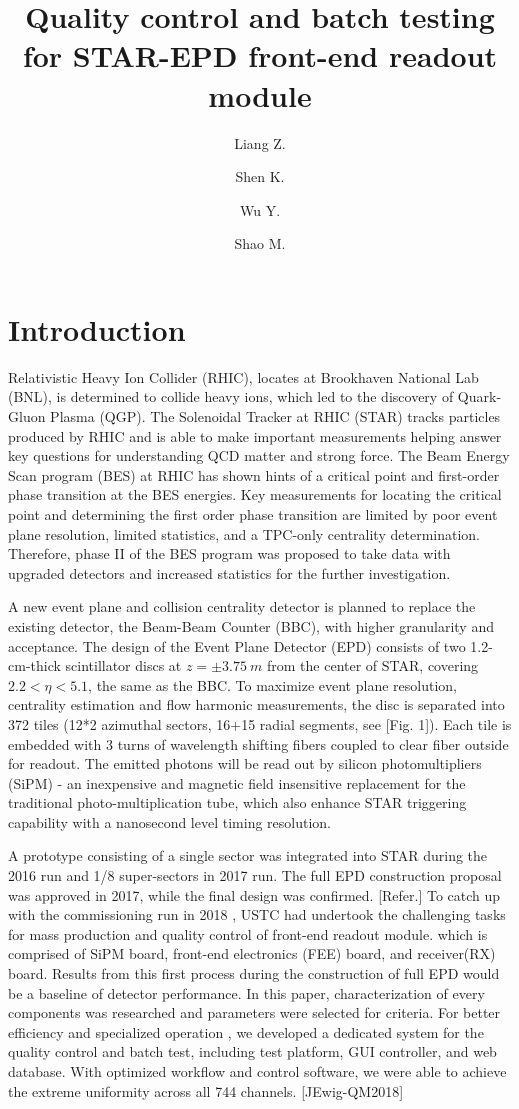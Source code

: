 \documentclass[11pt,a4paper]{article}
\title{Quality control and batch testing for STAR-EPD front-end readout module}
\author[a]{Liang Z.}
\author[a]{Shen K.}
\author[a]{Wu Y.}
\author[a]{Shao M.}
\affiliation[a]{University of Science and Technology of China, JinZhai Road, HEFEI, China}
\begin{document}
\maketitle
\flushbottom

\section{Introduction}
Relativistic Heavy Ion Collider (RHIC), locates at Brookhaven National Lab (BNL), is determined to collide heavy ions, which led to the discovery of Quark-Gluon Plasma (QGP).
The Solenoidal Tracker at RHIC (STAR) tracks particles produced by RHIC and is able to make important measurements helping answer key questions for understanding QCD matter and strong force.
The Beam Energy Scan program (BES) at RHIC has shown hints of a critical point and first-order phase transition at the BES energies.
Key measurements for locating the critical point and determining the first order phase transition are limited by poor event plane resolution, limited statistics, and a TPC-only centrality determination.
Therefore, phase II of the BES program was proposed to take data with upgraded detectors and increased statistics for the further investigation.\cite{pr17}\cite{cyang}

A new event plane and collision centrality detector is planned to replace the existing detector, the Beam-Beam Counter (BBC), with higher granularity and acceptance.
The design of the Event Plane Detector (EPD) consists of two 1.2-cm-thick scintillator discs at $z= \pm 3.75~m$ from the center of STAR, covering $2.2 <\eta< 5.1$, the same as the BBC.
To maximize event plane resolution, centrality estimation and flow harmonic measurements, the disc is separated into 372 tiles (12*2 azimuthal sectors, 16+15 radial segments, see [Fig. 1]).
Each tile is embedded with 3 turns of wavelength shifting fibers coupled to clear fiber outside for readout.
The emitted photons will be read out by silicon photomultipliers (SiPM) - an inexpensive and magnetic field insensitive replacement for the traditional photo-multiplication tube, which also enhance STAR triggering capability with a nanosecond level timing resolution.

A prototype consisting of a single sector was integrated into STAR during the 2016 run and 1/8 super-sectors in 2017 run. The full EPD construction proposal was approved in 2017, while the final design was confirmed. [Refer.]
To catch up with the commissioning run in 2018 , USTC had undertook the challenging tasks for mass production and quality control of front-end readout module. which is comprised of SiPM board, front-end electronics (FEE) board, and receiver(RX) board.
Results from this first process during the construction of full EPD would be a baseline of detector performance.
In this paper, characterization of every components was researched and parameters were selected for criteria. For better efficiency and specialized operation , we developed a dedicated system for the quality control and batch test, including test platform, GUI controller, and web database. With optimized workflow and control software, we were able to achieve the extreme uniformity across all 744 channels. [JEwig-QM2018]
\end{document}
